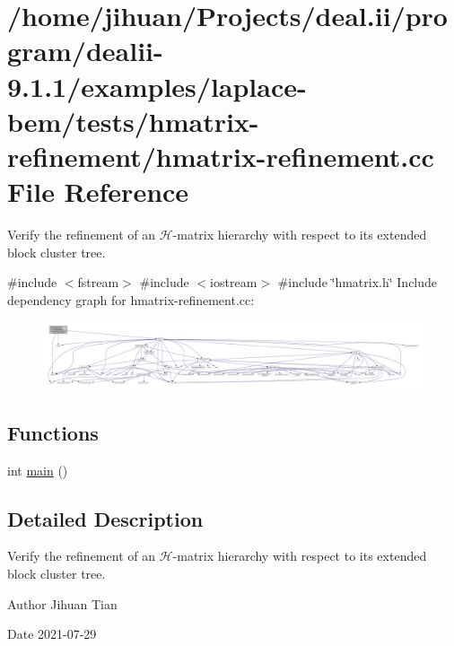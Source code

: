 \hypertarget{hmatrix-refinement_8cc}{}\section{/home/jihuan/\+Projects/deal.ii/program/dealii-\/9.1.1/examples/laplace-\/bem/tests/hmatrix-\/refinement/hmatrix-\/refinement.cc File Reference}
\label{hmatrix-refinement_8cc}


Verify the refinement of an $\mathcal{H}$-\/matrix hierarchy with respect to its extended block cluster tree.  


{\ttfamily \#include $<$fstream$>$}\newline
{\ttfamily \#include $<$iostream$>$}\newline
{\ttfamily \#include \char`\"{}hmatrix.\+h\char`\"{}}\newline
Include dependency graph for hmatrix-\/refinement.cc\+:
\nopagebreak
\begin{figure}[H]
\begin{center}
\leavevmode
\includegraphics[width=350pt]{hmatrix-refinement_8cc__incl}
\end{center}
\end{figure}
\subsection*{Functions}
\begin{DoxyCompactItemize}
\item 
int \hyperlink{hmatrix-refinement_8cc_ae66f6b31b5ad750f1fe042a706a4e3d4}{main} ()
\end{DoxyCompactItemize}


\subsection{Detailed Description}
Verify the refinement of an $\mathcal{H}$-\/matrix hierarchy with respect to its extended block cluster tree. 

\begin{DoxyAuthor}{Author}
Jihuan Tian 
\end{DoxyAuthor}
\begin{DoxyDate}{Date}
2021-\/07-\/29 
\end{DoxyDate}



